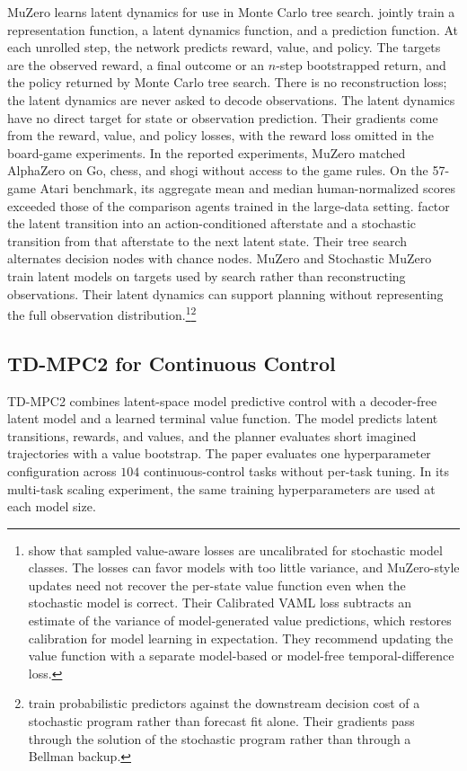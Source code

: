 MuZero learns latent dynamics for use in Monte Carlo tree search. \citet{Schrittwieser2020MuZero} jointly train a representation function, a latent dynamics function, and a prediction function. At each unrolled step, the network predicts reward, value, and policy. The targets are the observed reward, a final outcome or an $n$-step bootstrapped return, and the policy returned by Monte Carlo tree search. There is no reconstruction loss; the latent dynamics are never asked to decode observations. The latent dynamics have no direct target for state or observation prediction. Their gradients come from the reward, value, and policy losses, with the reward loss omitted in the board-game experiments. In the reported experiments, MuZero matched AlphaZero on Go, chess, and shogi without access to the game rules. On the 57-game Atari benchmark, its aggregate mean and median human-normalized scores exceeded those of the comparison agents trained in the large-data setting. \citet{Antonoglou2022StochMuZero} factor the latent transition into an action-conditioned afterstate and a stochastic transition from that afterstate to the next latent state. Their tree search alternates decision nodes with chance nodes. MuZero and Stochastic MuZero train latent models on targets used by search rather than reconstructing observations. Their latent dynamics can support planning without representing the full observation distribution.\footnote{\citet{VoelckerCalib2025} show that sampled value-aware losses are uncalibrated for stochastic model classes. The losses can favor models with too little variance, and MuZero-style updates need not recover the per-state value function even when the stochastic model is correct. Their Calibrated VAML loss subtracts an estimate of the variance of model-generated value predictions, which restores calibration for model learning in expectation. They recommend updating the value function with a separate model-based or model-free temporal-difference loss.}\footnote{\citet{DontiAmosKolter2017} train probabilistic predictors against the downstream decision cost of a stochastic program rather than forecast fit alone. Their gradients pass through the solution of the stochastic program rather than through a Bellman backup.}

\subsection{TD-MPC2 for Continuous Control}
\label{section:fc_tdmpc2}

TD-MPC2 \citep{Hansen2024TDMPC2} combines latent-space model predictive control with a decoder-free latent model and a learned terminal value function. The model predicts latent transitions, rewards, and values, and the planner evaluates short imagined trajectories with a value bootstrap. The paper evaluates one hyperparameter configuration across $104$ continuous-control tasks without per-task tuning. In its multi-task scaling experiment, the same training hyperparameters are used at each model size.

